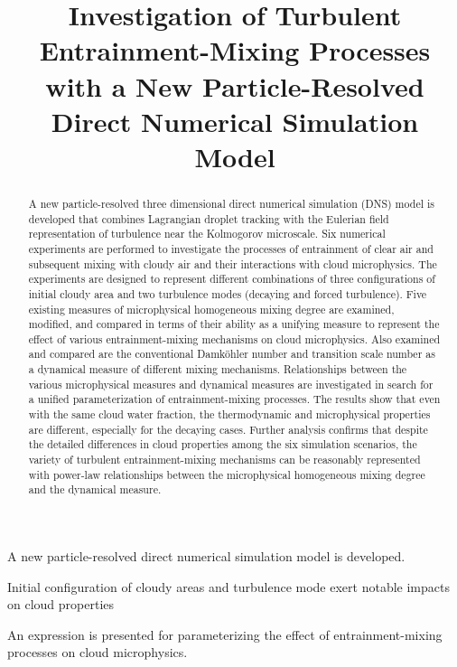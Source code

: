 \documentclass[draft,linenumbers]{agujournal}
\begin{document}
\title{Investigation of Turbulent Entrainment-Mixing Processes with a New Particle-Resolved Direct Numerical Simulation Model}



\begin{keypoints}
\item A new particle-resolved direct numerical simulation model is developed.
\item Initial configuration of cloudy areas and turbulence mode exert notable impacts on cloud properties
\item An expression is presented for parameterizing the effect of {entrainment-mixing} processes on cloud microphysics.
\end{keypoints}

\begin{abstract}
A new particle-resolved three dimensional direct numerical simulation (DNS) model is developed that combines Lagrangian droplet tracking with the Eulerian field representation of turbulence near the Kolmogorov microscale. Six numerical experiments are performed to investigate the processes of entrainment of clear air and subsequent mixing with cloudy air and their interactions with cloud microphysics. The experiments are designed to represent different combinations of three configurations of initial cloudy area and two turbulence modes (decaying and forced turbulence). Five existing measures of microphysical homogeneous mixing degree are examined, modified, and compared in terms of their ability as a unifying measure to represent the effect of various entrainment-mixing mechanisms on cloud microphysics. Also examined and compared are the conventional Damk\"ohler number and transition scale number as a dynamical measure of different mixing mechanisms. Relationships between the various microphysical measures and dynamical measures are investigated in search for a unified parameterization of entrainment-mixing processes. The results show that even with the same cloud water fraction, the thermodynamic and microphysical properties are different, especially for the decaying cases. Further analysis confirms that despite the detailed differences in cloud properties among the six simulation scenarios, the variety of turbulent entrainment-mixing mechanisms can be reasonably represented with power-law relationships between the microphysical homogeneous mixing degree and the dynamical measure.    
\end{abstract}
\end{document}
